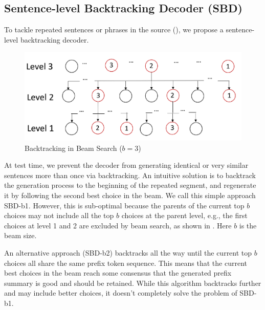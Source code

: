 \subsection{Sentence-level Backtracking Decoder (SBD)}

To tackle repeated sentences or phrases in the source (), 
we propose a sentence-level backtracking decoder.

\begin{figure}[th]
    \centering
    \includegraphics[width=0.8\linewidth]{SBD}
    \caption{Backtracking in Beam Search ($b=3$)}
    \label{fig:beam}
\end{figure}

At test time, we prevent the decoder from generating identical or
very similar sentences more than once via backtracking. 
An intuitive solution is to backtrack the generation process to the beginning
of the repeated segment, and regenerate it by following the second best choice
in the beam. We call this simple approach SBD-b1.
However, this is sub-optimal because the parents of the current top $b$
choices may not include all the top $b$ choices at the parent level, e.g.,
the first choices at level 1 and 2 are excluded by beam search,
as shown in . Here $b$ is the beam size.

An alternative approach (SBD-b2) backtracks all the way until the current
top $b$ choices all share the same prefix token sequence. This means
that the current best choices in the beam reach some consensus that
the generated prefix summary is good and should be retained. While
this algorithm backtracks further and may include better choices,
it doesn't completely solve the problem of SBD-b1.

